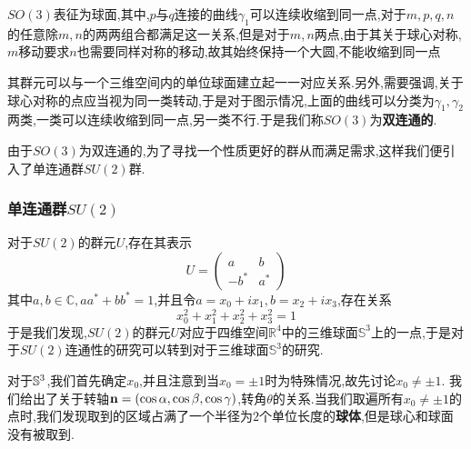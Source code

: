 \begin{marginfigure}
    \centering
    \caption{$SO(3)$表征为球面,其中,$ p $与$ q $连接的曲线$\gamma_1$可以连续收缩到同一点,对于$ m,p,q,n $的任意除$m,n$的两两组合都满足这一关系,但是对于$m,n$两点,由于其关于球心对称,$ m $移动要求$ n $也需要同样对称的移动,故其始终保持一个大圆,不能收缩到同一点}
\end{marginfigure}
其群元可以与一个三维空间内的单位球面建立起一一对应关系.另外,需要强调,关于球心对称的点应当视为同一类转动,于是对于图示情况,上面的曲线可以分类为$\gamma_1,\gamma_2$两类,一类可以连续收缩到同一点,另一类不行.于是我们称$SO(3)$为\textbf{双连通的}.

由于$SO(3)$为双连通的,为了寻找一个性质更好的群从而满足需求,这样我们便引入了单连通群$SU(2)$群.
\subsubsection{单连通群$SU(2)$}
对于$SU(2)$的群元$U$,存在其表示
\begin{equation}
    U=\begin{pmatrix}a&b\\-b^*&a^*\end{pmatrix}
\end{equation}
其中$a,b\in\mathbb C,aa^*+bb^*=1$,并且令$a=x_0+ix_1,b=x_2+ix_3$,存在关系
\begin{equation}
    x_0^2+x_1^2+x_2^2+x_3^2=1
\end{equation}
于是我们发现,$SU(2)$的群元$U$对应于四维空间$\mathbb R^4$中的三维球面$\mathbb S^3$上的一点,于是对于$SU(2)$连通性的研究可以转到对于三维球面$\mathbb S^3$的研究. 

对于$\mathbb{S}^3$,我们首先确定$x_0$,并且注意到当$x_0=\pm1$时为特殊情况,故先讨论$x_0\ne\pm1$.
我们给出了关于转轴$\mathbf{n}=(\cos\alpha,\cos\beta,\cos\gamma)$,转角$\theta$的关系.当我们取遍所有$x_0\ne\pm1$的点时,我们发现取到的区域占满了一个半径为$ 2 $个单位长度的\textbf{球体},但是球心和球面没有被取到.

